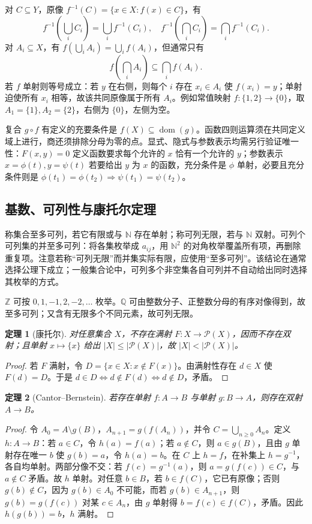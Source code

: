 \documentclass[11pt,a4paper,UTF8]{ctexart}
\newtheorem{theorem}{定理}[section]
\theoremstyle{definition}\newtheorem{definition}[theorem]{定义}
\theoremstyle{remark}\newtheorem{remark}[theorem]{说明}
\begin{document}
对 $C\subseteq Y$，原像 $f^{-1}(C)=\{x\in X:f(x)\in C\}$，有
\[
f^{-1}(\bigcup_i C_i)=\bigcup_i f^{-1}(C_i),\quad f^{-1}(\bigcap_i C_i)=\bigcap_i f^{-1}(C_i).
\]
对 $A_i\subseteq X$，有 $f(\bigcup_i A_i)=\bigcup_i f(A_i)$，但通常只有
\[
f(\bigcap_i A_i)\subseteq\bigcap_i f(A_i).
\]
若 $f$ 单射则等号成立：若 $y$ 在右侧，则每个 $i$ 存在 $x_i\in A_i$ 使 $f(x_i)=y$；单射迫使所有 $x_i$ 相等，故该共同原像属于所有 $A_i$。例如常值映射 $f:\{1,2\}\to\{0\}$，取 $A_1=\{1\},A_2=\{2\}$，右侧为 $\{0\}$，左侧为空。

复合 $g\circ f$ 有定义的充要条件是 $f(X)\subseteq\operatorname{dom}(g)$。函数四则运算须在共同定义域上进行，商还须排除分母为零的点。显式、隐式与参数表示均需另行验证唯一性：$F(x,y)=0$ 定义函数要求每个允许的 $x$ 恰有一个允许的 $y$；参数表示 $x=\phi(t),y=\psi(t)$ 若要给出 $y$ 为 $x$ 的函数，充分条件是 $\phi$ 单射，必要且充分条件则是 $\phi(t_1)=\phi(t_2)\Rightarrow\psi(t_1)=\psi(t_2)$。

\subsection{基数、可列性与康托尔定理}
称集合至多可列，若它有限或与 $\mathbb N$ 存在单射；称可列无限，若与 $\mathbb N$ 双射。可列个可列集的并至多可列：将各集枚举成 $a_{ij}$，用 $\mathbb N^2$ 的对角枚举覆盖所有项，再删除重复项。注意若称“可列无限”而并集实际有限，应使用“至多可列”。该结论在通常选择公理下成立；一般集合论中，可列多个非空集各自可列并不自动给出同时选择其枚举的方式。

$\mathbb Z$ 可按 $0,1,-1,2,-2,\ldots$ 枚举。$\mathbb Q$ 可由整数分子、正整数分母的有序对像得到，故至多可列；又含有无限多个不同元素，故可列无限。

\begin{theorem}[康托尔]
对任意集合 $X$，不存在满射 $F:X\to\mathcal P(X)$，因而不存在双射；且单射 $x\mapsto\{x\}$ 给出 $|X|\le|\mathcal P(X)|$，故 $|X|<|\mathcal P(X)|$。
\end{theorem}
\begin{proof}
若 $F$ 满射，令 $D=\{x\in X:x\notin F(x)\}$。由满射性存在 $d\in X$ 使 $F(d)=D$。于是 $d\in D\iff d\notin F(d)\iff d\notin D$，矛盾。
\end{proof}
\begin{theorem}[Cantor--Bernstein]
若存在单射 $f:A\to B$ 与单射 $g:B\to A$，则存在双射 $A\to B$。
\end{theorem}
\begin{proof}
令 $A_0=A\setminus g(B)$，$A_{n+1}=g(f(A_n))$，并令 $C=\bigcup_{n\ge0}A_n$。定义 $h:A\to B$：若 $a\in C$，令 $h(a)=f(a)$；若 $a\notin C$，则 $a\in g(B)$，且由 $g$ 单射存在唯一 $b$ 使 $g(b)=a$，令 $h(a)=b$。在 $C$ 上 $h=f$，在补集上 $h=g^{-1}$，各自均单射。两部分像不交：若 $f(c)=g^{-1}(a)$，则 $a=g(f(c))\in C$，与 $a\notin C$ 矛盾。故 $h$ 单射。对任意 $b\in B$，若 $b\in f(C)$，它已有原像；否则 $g(b)\notin C$，因为 $g(b)\in A_0$ 不可能，而若 $g(b)\in A_{n+1}$，则 $g(b)=g(f(c))$ 对某 $c\in A_n$，由 $g$ 单射得 $b=f(c)\in f(C)$，矛盾。因此 $h(g(b))=b$，$h$ 满射。\end{proof}
\end{document}
